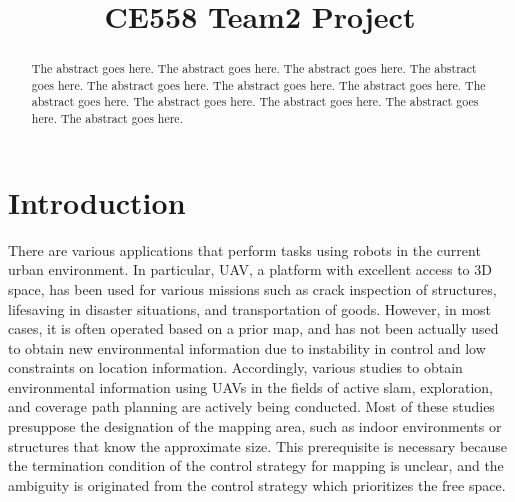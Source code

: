 \documentclass[conference,onecolumn]{IEEEtran} %
\begin{document}
%
\title{CE558 Team2 Project}


\author{
}


\maketitle


\begin{abstract}
The abstract goes here. The abstract goes here. The abstract goes here. The abstract goes here.
The abstract goes here. The abstract goes here. The abstract goes here. The abstract goes here.
The abstract goes here. The abstract goes here. The abstract goes here. The abstract goes here.
\end{abstract}


\section{Introduction}
There are various applications that perform tasks using robots in the current urban environment. In particular, UAV, a platform with excellent access to 3D space, has been used for various missions such as crack inspection of structures, lifesaving in disaster situations, and transportation of goods. However, in most cases, it is often operated based on a prior map, and has not been actually used to obtain new environmental information due to instability in control and low constraints on location information. Accordingly, various studies to obtain environmental information using UAVs in the fields of active slam, exploration, and coverage path planning are actively being conducted. Most of these studies presuppose the designation of the mapping area, such as indoor environments or structures that know the approximate size. This prerequisite is necessary because the termination condition of the control strategy for mapping is unclear, and the ambiguity is originated from the control strategy which prioritizes the free space.
\end{document}
